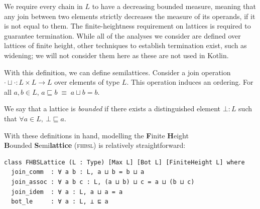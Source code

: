 \documentclass[runningheads]{llncs}
\newcommand{\lub}{\sqcup}
\newcommand{\squb}{\sqsubseteq}
\newcommand{\fhbsl}{\textsc{fhbsl}}
\begin{document}
We require every chain in $L$ to have a decreasing bounded measure, meaning that any join between two elements strictly decreases the measure of its operands, if it is not equal to them. The finite-heightness requirement on lattices is required to guarantee termination. While all of the analyses we consider are defined over lattices of finite height, other techniques to establish termination exist, such as widening; we will not consider them here as these are not used in Kotlin.

With this definition, we can define semilattices. Consider a join operation $\cdot \lub \cdot : L \times L \to L$ over elements of type $L$. This operation induces an ordering. For all $a, b \in L$, $a \squb b \;\equiv\; a \lub b = b$.

We say that a lattice is \emph{bounded} if there exists a distinguished element $\bot : L$ such that $\forall a \in L,\ \bot \squb a$.

With these definitions in hand, modelling the \textbf{F}inite \textbf{H}eight\\
\textbf{B}ounded \textbf{S}emi\textbf{lattice} (\fhbsl{}) is relatively straightforward:

\begin{lstlisting}[language=Lean]
class FHBSLattice (L : Type) [Max L] [Bot L] [FiniteHeight L] where
  join_comm  : ∀ a b : L, a ⊔ b = b ⊔ a
  join_assoc : ∀ a b c : L, (a ⊔ b) ⊔ c = a ⊔ (b ⊔ c)
  join_idem  : ∀ a : L, a ⊔ a = a
  bot_le     : ∀ a : L, ⊥ ⊑ a
\end{lstlisting}
\end{document}
